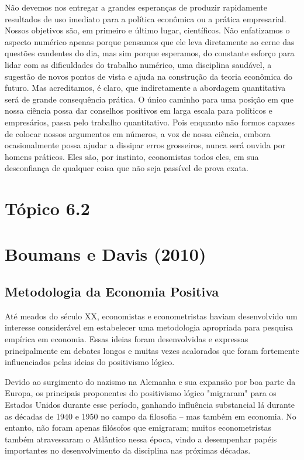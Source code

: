 \documentclass[12pt]{article}
\begin{document}
Não devemos nos entregar a grandes esperanças de produzir rapidamente resultados de uso imediato para a política econômica ou a prática empresarial. Nossos objetivos são, em primeiro e último lugar, científicos. Não enfatizamos o aspecto numérico apenas porque pensamos que ele leva diretamente ao cerne das questões candentes do dia, mas sim porque esperamos, do constante esforço para lidar com as dificuldades do trabalho numérico, uma disciplina saudável, a sugestão de novos pontos de vista e ajuda na construção da teoria econômica do futuro. Mas acreditamos, é claro, que indiretamente a abordagem quantitativa será de grande consequência prática. O único caminho para uma posição em que nossa ciência possa dar conselhos positivos em larga escala para políticos e empresários, passa pelo trabalho quantitativo. Pois enquanto não formos capazes de colocar nossos argumentos em números, a voz de nossa ciência, embora ocasionalmente possa ajudar a dissipar erros grosseiros, nunca será ouvida por homens práticos. Eles são, por instinto, economistas todos eles, em sua desconfiança de qualquer coisa que não seja passível de prova exata.

\newpage
\section*{\textbf{Tópico 6.2}}

\section{\textbf{Boumans e Davis (2010)}}
\subsection{\textbf{Metodologia da Economia Positiva}}

Até meados do século XX, economistas e econometristas
haviam desenvolvido um interesse considerável em estabelecer uma metodologia apropriada
para pesquisa empírica em economia. Essas ideias foram desenvolvidas
e expressas principalmente em debates longos e muitas vezes acalorados que foram
fortemente influenciados pelas ideias do positivismo lógico.

Devido ao surgimento do nazismo na Alemanha e sua expansão por
boa parte da Europa, os principais proponentes do positivismo lógico "migraram"
para os Estados Unidos durante esse período, ganhando influência substancial lá
durante as décadas de 1940 e 1950 no campo da filosofia – mas também em economia.
No entanto, não foram apenas filósofos que emigraram; muitos econometristas
também atravessaram o Atlântico nessa época, vindo a desempenhar papéis importantes
no desenvolvimento da disciplina nas próximas décadas.
\end{document}
